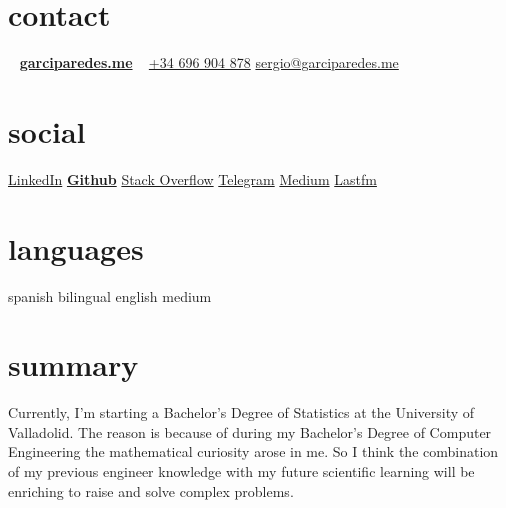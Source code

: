 \documentclass[]{friggeri-cv} %
\begin{document}


    \begin{aside} %

        \section{contact}
            ~
            \href{http://garciparedes.me}{\textbf{garciparedes.me}}
            ~
            \href{tel:+34 696 904 878}{+34 696 904 878}
            \href{mailto:sergio@garciparedes.me}{sergio@garciparedes.me}
        \section{social}
            \href{https://es.linkedin.com/in/garciparedes/en}{LinkedIn\quad\faLinkedin }
            \href{https://github.com/garciparedes}{\quad{\color{red} $\varheartsuit$}\quad\textbf{Github}\quad\faGithub }
            \href{http://stackoverflow.com/users/3921457/garciparedes}{Stack Overflow\quad\faStackOverflow }
            \href{https://telegram.me/garciparedes}{Telegram\quad\faPaperPlane }
            \href{https://medium.com/@garciparedes}{Medium\quad\faMedium }
            \href{https://www.last.fm/user/garciparedes/listening-report/week}{Lastfm\quad\faLastfm}
        \section{languages}
            spanish bilingual
            english medium
    \end{aside}




    \section{summary}

        Currently, I'm starting a Bachelor's Degree of Statistics at the University of Valladolid. The reason is because of during my Bachelor's Degree of Computer Engineering the mathematical curiosity arose in me. So I think the combination of my previous engineer knowledge with my future scientific learning will be enriching to raise and solve complex problems.
\end{document}
